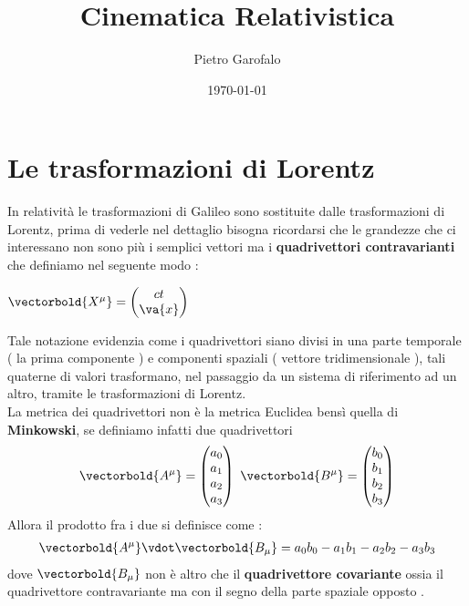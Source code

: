 \documentclass[a4paper, 12pt, twoside]{report}
\title{Cinematica Relativistica}
\author{Pietro Garofalo}
\date{\today}
\begin{document}
\maketitle
\newpage
\tableofcontents

\chapter{Le trasformazioni di Lorentz }
In relatività le trasformazioni di Galileo sono sostituite dalle trasformazioni di Lorentz, prima di vederle nel dettaglio bisogna ricordarsi 
che le grandezze che ci interessano non sono più i semplici vettori ma i \textbf{ quadrivettori contravarianti } che definiamo nel seguente modo :
\begin{center}
        
        $ \vectorbold{X^{\mu}} = \begin{pmatrix} ct\\ \va{x} \end{pmatrix} $

\end{center}
Tale notazione evidenzia come i quadrivettori siano divisi in una parte temporale ( la prima componente ) e componenti spaziali ( vettore tridimensionale ), 
tali quaterne di valori trasformano, nel passaggio da un sistema di riferimento ad un altro, tramite le trasformazioni di Lorentz. \\
La metrica dei quadrivettori non è la metrica Euclidea bensì quella di \textbf{Minkowski}, se definiamo infatti due quadrivettori 
\begin{align*}
        \vectorbold{A^{\mu}} = \begin{pmatrix} a_0\\a_1\\a_2\\a_3\end{pmatrix}
        \
        \vectorbold{B^{\mu}} = \begin{pmatrix} b_0\\b_1\\b_2\\b_3\end{pmatrix}
\end{align*}
Allora il prodotto fra i due si definisce come :
\begin{align*}
        \vectorbold{A^{\mu}}\vdot\vectorbold{B_{\mu}} = a_0b_0 - a_1b_1 - a_2b_2 - a_3b_3
\end{align*}
dove $\vectorbold{B_{\mu}}$ non è altro che il \textbf{quadrivettore covariante} ossia il quadrivettore contravariante ma con il segno della parte spaziale opposto .\\
\end{document}
